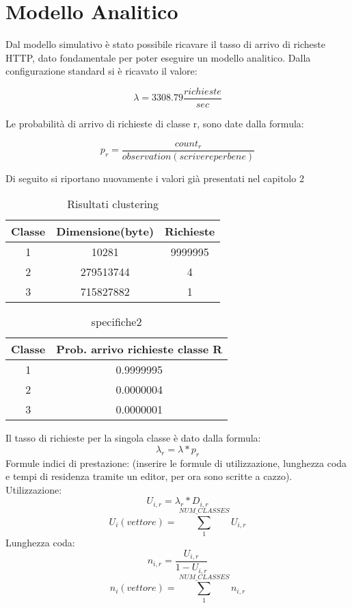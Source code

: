 \chapter{Modello Analitico}
Dal modello simulativo è stato possibile ricavare il tasso di arrivo di richeste HTTP, dato fondamentale per poter eseguire un modello analitico. Dalla configurazione standard si è ricavato il valore: 

$$\lambda =  3308.79 \frac{richieste}{sec}$$

Le probabilità di arrivo di richieste di classe r, sono date dalla formula:

$$p_{r} = \frac{count_{r}}{observation (scrivere per bene)}$$

Di seguito si riportano nuovamente i valori già presentati nel capitolo 2
\begin{table}[htbp]
\begin{center}
\begin{tabular}{||c|c|c||}
\hline
Classe	&Dimensione(byte)		&Richieste \\ 
\hline\hline
1 &10281 &9999995\\ \hline
2 &279513744 &4 \\ \hline
3 &715827882 &1 \\ \hline
\end{tabular}
\end{center}
\caption{Risultati clustering}
\label{risclustering}
\end{table}
\begin{table}[H]
\begin{center}
\begin{tabular}{||c|c||}
\hline
Classe		&Prob. arrivo richieste classe R	\\
\hline
\hline
1		&0.9999995	\\
\hline
2		&0.0000004\\
\hline
3		&0.0000001\\
\hline
\end{tabular}
\end{center}
\caption{specifiche2}
\label{test_2}
\end{table}
Il tasso di richieste per la singola classe è dato dalla formula: 
$$
\lambda_{r} = \lambda*p_{r}
$$
Formule indici di prestazione:
(inserire le formule di utilizzazione, lunghezza coda e tempi di residenza tramite un editor, per ora sono scritte a cazzo).
Utilizzazione:
$$U_{i,r} = \lambda_{r} * D_{i,r}$$
$$U_{i} (vettore)  = \sum_{1}^{NUM\_CLASSES} U_{i,r}$$
Lunghezza coda:
$$n_{i,r} = \frac{U_{i,r}}{1 - U_{i,r}}$$
$$n_{i} (vettore) = \sum_{1}^{NUM\_CLASSES} n_{i,r}$$
